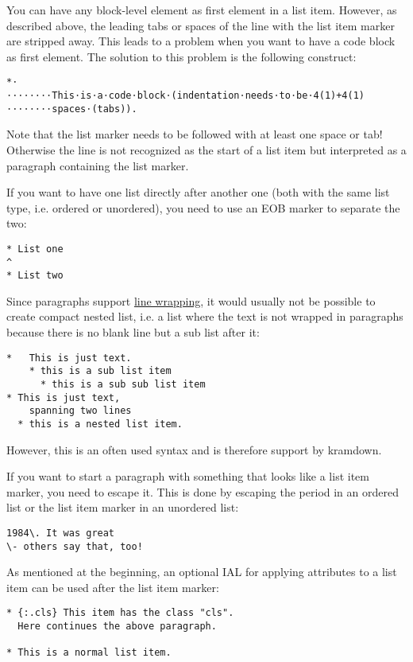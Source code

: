 \documentclass[a4paper]{article}
\begin{document}
You can have any block-level element as first element in a list item.
However, as described above, the leading tabs or spaces of the line with
the list item marker are stripped away. This leads to a problem when you
want to have a code block as first element. The solution to this problem
is the following construct:

\begin{verbatim}
*⋅
⋅⋅⋅⋅⋅⋅⋅⋅This⋅is⋅a⋅code⋅block⋅(indentation⋅needs⋅to⋅be⋅4(1)+4(1)
⋅⋅⋅⋅⋅⋅⋅⋅spaces⋅(tabs)).
\end{verbatim}

Note that the list marker needs to be followed with at least one space
or tab! Otherwise the line is not recognized as the start of a list item
but interpreted as a paragraph containing the list marker.

If you want to have one list directly after another one (both with the
same list type, i.e. ordered or unordered), you need to use an EOB
marker to separate the two:

\begin{verbatim}
* List one
^
* List two
\end{verbatim}

Since paragraphs support \protect\hyperlink{line-wrapping}{line
wrapping}, it would usually not be possible to create compact nested
list, i.e. a list where the text is not wrapped in paragraphs because
there is no blank line but a sub list after it:

\begin{verbatim}
*   This is just text.
    * this is a sub list item
      * this is a sub sub list item
* This is just text,
    spanning two lines
  * this is a nested list item.
\end{verbatim}

However, this is an often used syntax and is therefore support by
kramdown.

If you want to start a paragraph with something that looks like a list
item marker, you need to escape it. This is done by escaping the period
in an ordered list or the list item marker in an unordered list:

\begin{verbatim}
1984\. It was great
\- others say that, too!
\end{verbatim}

As mentioned at the beginning, an optional IAL for applying attributes
to a list item can be used after the list item marker:

\begin{verbatim}
* {:.cls} This item has the class "cls".
  Here continues the above paragraph.

* This is a normal list item.
\end{verbatim}
\end{document}
